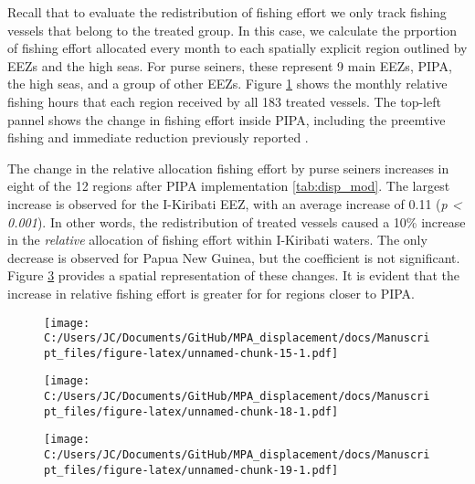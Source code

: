 \documentclass[12pt,]{article}
\begin{document}
Recall that to evaluate the redistribution of fishing effort we only
track fishing vessels that belong to the treated group. In this case, we
calculate the prportion of fishing effort allocated every month to each
spatially explicit region outlined by EEZs and the high seas. For purse
seiners, these represent 9 main EEZs, PIPA, the high seas, and a group
of other EEZs. Figure \ref{fig:redist_trend_ps} shows the monthly
relative fishing hours that each region received by all 183 treated
vessels. The top-left pannel shows the change in fishing effort inside
PIPA, including the preemtive fishing and immediate reduction previously
reported \citep{mcdermott_2018}.

The change in the relative allocation fishing effort by purse seiners
increases in eight of the 12 regions after PIPA implementation
\ref{tab:disp_mod}. The largest increase is observed for the I-Kiribati
EEZ, with an average increase of 0.11 (\emph{p \textless{} 0.001}). In
other words, the redistribution of treated vessels caused a 10\%
increase in the \emph{relative} allocation of fishing effort within
I-Kiribati waters. The only decrease is observed for Papua New Guinea,
but the coefficient is not significant. Figure \ref{fig:map_change_ps}
provides a spatial representation of these changes. It is evident that
the increase in relative fishing effort is greater for for regions
closer to PIPA.

\begin{figure}
\centering
\texttt{[image: C:/Users/JC/Documents/GitHub/MPA\_displacement/docs/Manuscript\_files/figure-latex/unnamed-chunk-15-1.pdf]}
\caption{\label{fig:unnamed-chunk-15}\label{fig:redist_trend_ps}}
\end{figure}

\begin{figure}
\centering
\texttt{[image: C:/Users/JC/Documents/GitHub/MPA\_displacement/docs/Manuscript\_files/figure-latex/unnamed-chunk-18-1.pdf]}
\caption{\label{fig:unnamed-chunk-18}\label{fig:map_change_ps}}
\end{figure}

\begin{figure}
\centering
\texttt{[image: C:/Users/JC/Documents/GitHub/MPA\_displacement/docs/Manuscript\_files/figure-latex/unnamed-chunk-19-1.pdf]}
\caption{\label{fig:unnamed-chunk-19}\label{fig:map_change_ps}}
\end{figure}
\end{document}
